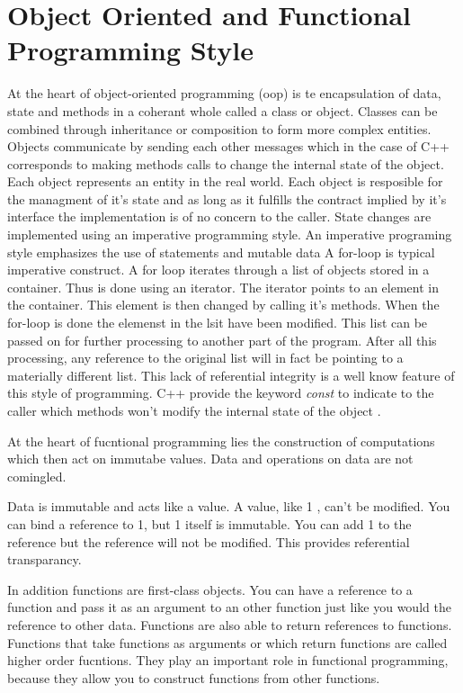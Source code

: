 \documentclass[12pt,fleqn]{article}
\begin{document}
\section*{Object Oriented and Functional Programming Style}
At the heart of object-oriented programming (oop) is te encapsulation of data, state and methods in a coherant whole called a class or object.
Classes can be combined through inheritance or composition to form more complex entities.
Objects communicate by sending each other messages which in the case of C++ corresponds to making methods calls to change the internal state of the object.
Each object represents an entity in the real world. 
Each object is resposible for the managment of it's state and as long as it fulfills the contract implied by it's interface the implementation is of no concern to the caller.
State changes are implemented using an imperative programming style. 
An imperative programing style emphasizes the use of statements and mutable data
A for-loop is  typical imperative construct.
A for loop iterates through a list of objects stored in a container.
Thus is done using an iterator.
The iterator points to an element in the container.
This element is then changed by calling it's methods.
When the for-loop is done the elemenst in the lsit have been modified.
This list can be passed on for further processing to another part of the program.
After all this processing, any reference to the original list will in fact be pointing to a materially different list.
This lack of referential integrity is a well know feature of this style of programming.
C++ provide the keyword {\em const} to indicate to the caller which methods won't modify the internal state of the object \cite{stroustrup}.


At the heart of fucntional programming lies the construction of computations which then act on immutabe values.
Data and operations on data are not comingled.

Data is immutable and acts like a value. 
A value, like 1 , can't be modified.
You can bind a reference to 1, but 1 itself is immutable.
You can add 1 to the reference but the reference will not be modified.
This provides referential transparancy.

In addition functions are first-class objects.
You can have a reference to a function and pass it as an argument to an other function just like you would the reference to other data.
Functions are also able to return references to functions.
Functions that take functions as arguments or which return functions are called higher order fucntions.
They play an important role in functional programming, because they allow you to construct functions from other functions.
\end{document}
